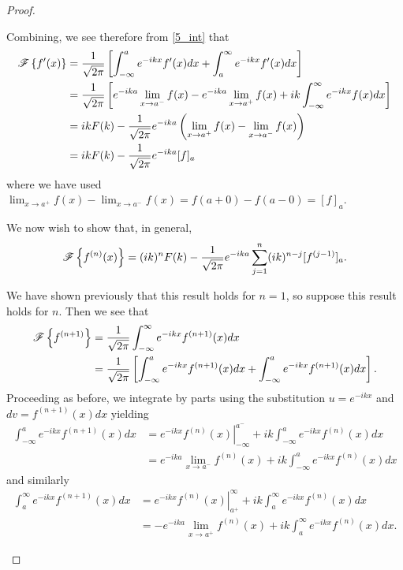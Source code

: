 \begin{proof}
\begin{enumerate}
      Combining, we see therefore from \eqref{5_int} that
      \begin{align*}
        \mathscr{F}\left\{ {f'(x)} \right\} &= \frac{1}{\sqrt{2\pi}} \left[\int_{-\infty}^{a} e^{-ikx} f'(x) dx + \int_{a}^{\infty} e^{-ikx} f'(x) dx \right] \\
        &= \frac{1}{\sqrt{2\pi}} \left[
          e^{-ika} \lim_{x\to a^{-}}f(x)
          -e^{-ika} \lim_{x\to a^{+}}f(x)  + ik \int_{-\infty}^\infty e^{-ikx}f(x) dx
        \right] \\
        &= ik F(k) - \frac{1}{\sqrt{2\pi}}e^{-ika}\left( \lim_{x\to a^+} f(x) - \lim_{x\to a^{-}} f(x)\right) \\
        &= ik F(k) - \frac{1}{\sqrt{2\pi}}e^{-ika} [f]_a
      \end{align*}
      where we have used $\lim_{x\to a^+} f(x) - \lim_{x\to a^{-}} f(x) = f(a+0) - f(a-0) = [f]_a$.

      We now wish to show that, in general,
      \begin{align}\label{ind_four}
        \mathscr{F}\left\{ {f^{(n)}(x)} \right\} = (ik)^n F(k) - \frac{1}{\sqrt{2\pi}}e^{-ika}\sum_{j=1}^{n} (ik)^{n-j} [f^{(j-1)}]_a.
      \end{align}

      We have shown previously that this result holds for $n=1$, so suppose this result
      holds for $n$.
      Then we see that
      \begin{align*}
        \mathscr{F}\left\{ {f^{(n+1)}} \right\} &= \frac{1}{\sqrt{2\pi}}\int_{-\infty}^{\infty}e^{-ikx}f^{(n+1)}(x)dx \\
        &= \frac{1}{\sqrt{2\pi}}\left[\int_{-\infty}^{a}e^{-ikx}f^{(n+1)}(x)dx + \int_{-\infty}^{a}e^{-ikx}f^{(n+1)}(x)dx\right].
      \end{align*}
      Proceeding as before, we integrate by parts using the substitution $u = e^{-ikx}$ and $dv = f^{(n+1)}(x)dx$ yielding
      \begin{align*}
        \int_{-\infty}^{a}e^{-ikx}f^{(n+1)}(x)dx &= \left. e^{-ikx}f^{(n)}(x)\right\rvert_{-\infty}^{a^-} + ik \int_{-\infty}^{a} e^{-ikx} f^{(n)}(x)dx \\
        &= e^{-ika}\lim_{x\to a^{-}}f^{(n)}(x) + ik \int_{-\infty}^{a} e^{-ikx} f^{(n)}(x)dx
      \end{align*}
      and similarly
      \begin{align*}
        \int_{a}^{\infty}e^{-ikx}f^{(n+1)}(x)dx &= \left. e^{-ikx}f^{(n)}(x)\right\rvert_{a^+}^{\infty} + ik \int_{a}^{\infty} e^{-ikx} f^{(n)}(x)dx \\
        &= -e^{-ika}\lim_{x\to a^{+}}f^{(n)}(x) + ik \int_{a}^{\infty} e^{-ikx} f^{(n)}(x)dx.
      \end{align*}


\end{enumerate}
\end{proof}
